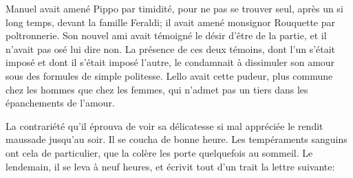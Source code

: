 Manuel avait amené Pippo par timidité, pour ne pas se trouver seul,
après un si long temps, devant la famille Feraldi; il avait amené
monsignor Rouquette par poltronnerie. Son nouvel ami avait témoigné le
désir d'être de la partie, et il n'avait pas osé lui dire non. La
présence de ces deux témoins, dont l'un s'était imposé et dont il
s'était imposé l'autre, le condamnait à dissimuler son amour sous des
formules de simple politesse. Lello avait cette pudeur, plus commune
chez les hommes que chez les femmes, qui n'admet pas un tiers dans les
épanchements de l'amour.

La contrariété qu'il éprouva de voir sa délicatesse si mal appréciée le
rendit maussade jusqu'au soir. Il se coucha de bonne heure. Les
tempéraments sanguins ont cela de particulier, que la colère les porte
quelquefois au sommeil. Le lendemain, il se leva à neuf heures, et
écrivit tout d'un trait la lettre suivante:

